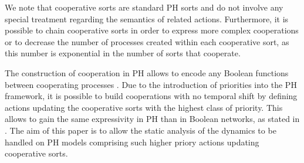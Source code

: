 We note that cooperative sorts are standard PH sorts and do not involve any
special treatment regarding the semantics of related actions.
Furthermore, it is possible to chain cooperative sorts in order to express more complex cooperations
or to decrease the number of processes created within each cooperative sort,
as this number is exponential in the number of sorts that cooperate.

\begin{comment}
When the number of cooperating processes is large, it is possible to chain several cooperative sorts
to prevent the combinatoric explosion of the number of processes created within cooperative sorts.
For instance, if $b_1$, $c_1$, and $d_1$ cooperate, one can create a cooperative sort $bc$ with 4
processes reflecting the presence of $b_1$ and $c_1$, and a cooperative sort $bcd$ with 4 processes
reflecting the presence of $bc_{11}$ and $d_1$.  Such constructions are helpful in PH
as the static analysis of dynamics developed in \cite{PMR12-MSCS} does not suffer from the number of
sorts, but on the number of processes within a single sort.
\end{comment}

The construction of cooperation in PH allows to encode any Boolean functions between cooperating processes \cite{PMR10-TCSB}.
Due to the introduction of priorities into the PH framework,
it is possible to build cooperations with no temporal shift by defining actions updating the cooperative sorts with the highest class of priority.
This allows to gain the same expressivity in PH than in Boolean networks, as stated in .
The aim of this paper is to allow the static analysis of the dynamics to be handled on PH models comprising such higher priory actions updating cooperative sorts.

\begin{comment}
\begin{example}
The PH in \pref{fig:runningPH-2} results from the refinement of the PH in \pref{fig:runningPH-1}
where several cooperations have been specified.
In particular, the bounce to $a_2$ is the result of a cooperation between $b_1$ and $c_1$; and the
bounce to $a_0$ of a cooperation between $b_0$ and $c_0$.
Hence, this PH expresses a BRN where $a$ requires both $b$ and $c$ active to reach its
highest level, and $a$ does not become inactive unless both $b$ and $c$ are inactive.
\end{example}
\end{comment}



